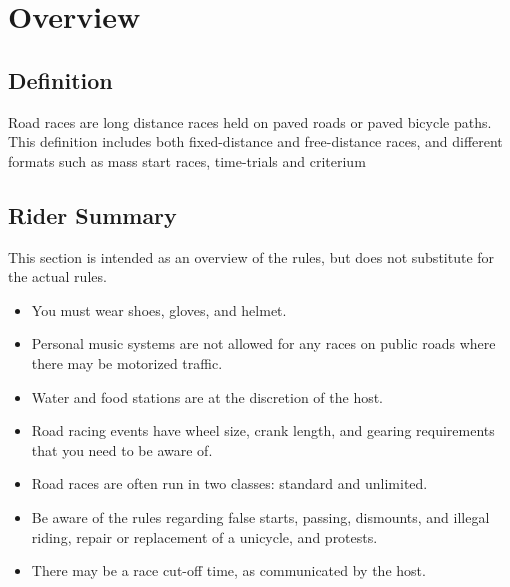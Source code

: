 \chapter{Overview \label{chap:road_racing}}

\section{Definition}

Road races are long distance races held on paved roads or paved bicycle paths.
This definition includes both fixed-distance and free-distance races, and different formats such as mass start races, time-trials and criterium

\section{Rider Summary}

This section is intended as an overview of the rules, but does not substitute for the actual rules.
\begin{itemize}
\item You must wear shoes, gloves, and helmet.
\item Personal music systems are not allowed for any races on public roads where there may be motorized traffic.
\item Water and food stations are at the discretion of the host.
\item Road racing events have wheel size, crank length, and gearing
requirements that you need to be aware of.
\item Road races are often run in two classes: standard and unlimited.
\item Be aware of the rules regarding false starts, passing, dismounts, and illegal riding, repair or replacement of a unicycle, and protests.
\item There may be a race cut-off time, as communicated by the host.
\end{itemize}
